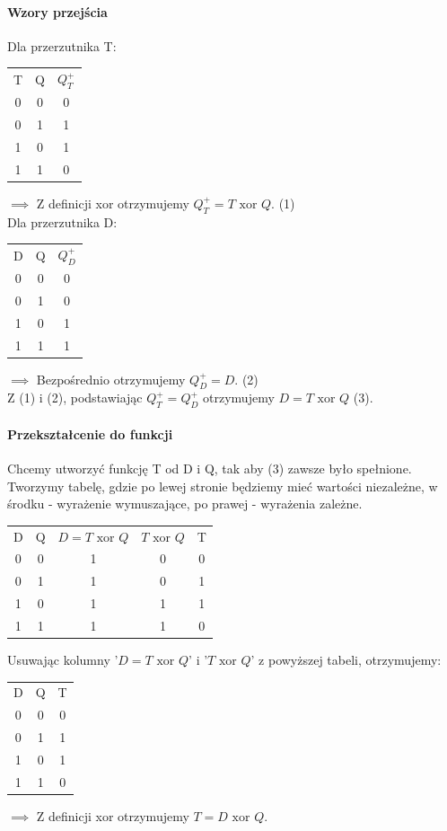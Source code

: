 \documentclass{article}
\begin{document}
\paragraph{Wzory przejścia}
Dla przerzutnika T: \\
\begin{tabular}{c c c}
T & Q & $Q_{T}^{+}$ \\
0 & 0 & 0 \\
0 & 1 & 1 \\
1 & 0 & 1 \\
1 & 1 & 0
\end{tabular}
$\implies$ Z definicji xor otrzymujemy $Q^{+}_{T} = T \text{ xor } Q$. (1) \\
Dla przerzutnika D: \\
\begin{tabular}{c c c}
D & Q & $Q_{D}^{+}$ \\
0 & 0 & 0 \\
0 & 1 & 0 \\
1 & 0 & 1 \\
1 & 1 & 1
\end{tabular}
$\implies $ Bezpośrednio otrzymujemy $Q_{D}^{+} = D$. (2)\\
Z (1) i (2), podstawiając $Q^{+}_{T} = Q^{+}_{D}$ otrzymujemy $D = T \text{ xor } Q$ (3).
\paragraph{Przekształcenie do funkcji}
Chcemy utworzyć funkcję T od D i Q, tak aby (3) zawsze było spełnione. Tworzymy tabelę, gdzie po lewej stronie będziemy mieć wartości niezależne, w środku - wyrażenie wymuszające, po prawej - wyrażenia zależne.
\begin{center}
\begin{tabular}{c c | c | c c }
D & Q & $D = T \text{ xor } Q$ & $T \text{ xor } Q$ & T \\
0 & 0 & 1 & 0 & 0\\
0 & 1 & 1 & 0 & 1\\
1 & 0 & 1 & 1 & 1\\
1 & 1 & 1 & 1 & 0
\end{tabular}
\end{center}
Usuwając kolumny '$D = T \text{ xor } Q$' i '$T \text{ xor } Q$' z powyższej tabeli, otrzymujemy:
\begin{tabular}{c c c }
D & Q & T \\
0 & 0 & 0\\
0 & 1 & 1\\
1 & 0 & 1\\
1 & 1 & 0
\end{tabular} $\implies$ Z definicji xor otrzymujemy $ T = D \text{ xor } Q$. \\
\newpage
\end{document}
